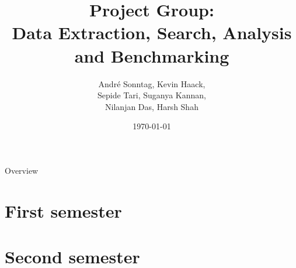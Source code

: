\documentclass{beamer}
\title{Project Group:\\Data Extraction, Search, Analysis and Benchmarking}
\author{André Sonntag, Kevin Haack,\\Sepide Tari, Suganya Kannan,\\Nilanjan Das, Harsh Shah}
\institute{Paderborn University}
\date{\today}
\begin{document}
\begin{frame}
  \titlepage
\end{frame}

\begin{frame}{Overview}
\tableofcontents
\end{frame}



\section{First semester}











\section{Second semester}















\end{document}
